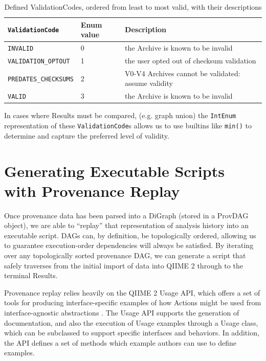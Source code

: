 \begin{table}[htp]
    \centering
    \begin{tabular}{|p{}|p{}|p{}|}
    \hline
    \texttt{ValidationCode}      & Enum value & Description                                          \\ \hline
    \texttt{INVALID}             & 0          & the Archive is known to be invalid                   \\
    \texttt{VALIDATION\_OPTOUT}  & 1          & the user opted out of checksum validation            \\
    \texttt{PREDATES\_CHECKSUMS} & 2          & V0-V4 Archives cannot be validated: assume validity  \\
    \texttt{VALID}               & 3          & the Archive is known to be invalid                   \\ \hline
    \end{tabular}
    \caption[Defined ValidationCodes, ordered from least to most valid, with their descriptions]%
    {Defined ValidationCodes, ordered from least to most valid, with their descriptions}
    \label{tab:validationCodes}
\end{table}

\noindent In cases where Results must be compared, (e.g. graph union) the \texttt{IntEnum}
representation of these \texttt{ValidationCode}s allows us to use builtins like \texttt{min()} to
determine and capture the preferred level of validity.


\section{Generating Executable Scripts with Provenance Replay}

Once provenance data has been parsed into a DiGraph (stored in a ProvDAG
object), we are able to “replay” that representation of analysis history into an
executable script. DAGs can, by definition, be topologically ordered, allowing
us to guarantee execution-order dependencies will always be satisfied. By
iterating over any topologically sorted provenance DAG, we can generate a script
that safely traverses from the initial import of data into QIIME 2 through to
the terminal Results.

Provenance replay relies heavily on the QIIME 2 Usage API, which offers a set of
tools for producing interface-specific examples of how Actions might be used
from interface-agnostic abstractions \parencite{qiime_2_development_team_usage_2018}.
The Usage API supports the generation of documentation, and also the execution
of Usage examples through a Usage class, which can be subclassed to support
specific interfaces and behaviors. In addition, the API defines a set of methods
which example authors can use to define examples.

